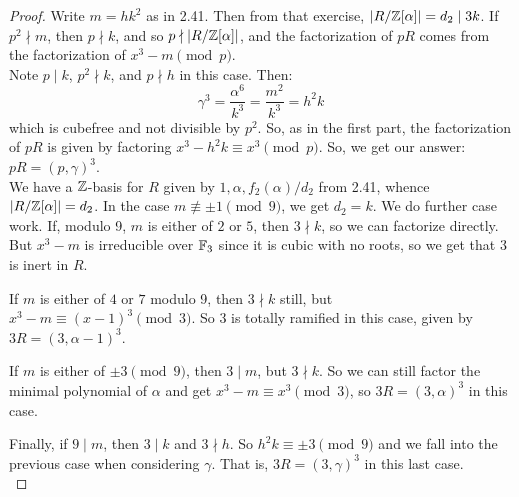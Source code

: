 \begin{proof}
	Write $m = hk^2$ as in 2.41. Then from that exercise, $|R/\mathbb{Z}[\alpha]| = d_2 \mid 3k$. If $p^2 \nmid m$, then $p \nmid k$, and so $p \nmid |R/\mathbb{Z}[\alpha]|$, and the factorization of $pR$ comes from the factorization of $x^3-m \pmod{p}$. \\
	
	Note $p \mid k$, $p^2 \nmid k$, and $p \nmid h$ in this case. Then:
	\[ \gamma^3 = \frac{\alpha^6}{k^3} = \frac{m^2}{k^3} = h^2k \]
	which is cubefree and not divisible by $p^2$. So, as in the first part, the factorization of $pR$ is given by factoring $x^3-h^2k \equiv x^3 \pmod{p}$. So, we get our answer: $pR = (p,\gamma)^3$. \\
	
	We have a $\mathbb{Z}$-basis for $R$ given by $1,\alpha,f_2(\alpha)/d_2$ from 2.41, whence $|R/\mathbb{Z}[\alpha]| = d_2$. In the case $m \not\equiv \pm 1 \pmod{9}$, we get $d_2 = k$. We do further case work. If, modulo 9, $m$ is either of $2$ or $5$, then $3 \nmid k$, so we can factorize directly. But $x^3-m$ is irreducible over $\mathbb{F}_3$ since it is cubic with no roots, so we get that $3$ is inert in $R$.
	
	If $m$ is either of $4$ or $7$ modulo 9, then $3 \nmid k$ still, but $x^3-m \equiv (x-1)^3 \pmod{3}$. So $3$ is totally ramified in this case, given by $3R = (3,\alpha-1)^3$.
	
	If $m$ is either of $\pm 3 \pmod{9}$, then $3 \mid m$, but $3 \nmid k$. So we can still factor the minimal polynomial of $\alpha$ and get $x^3-m \equiv x^3 \pmod{3}$, so $3R = (3,\alpha)^3$ in this case.
	
	Finally, if $9 \mid m$, then $3 \mid k$ and $3 \nmid h$. So $h^2k \equiv \pm 3 \pmod{9}$ and we fall into the previous case when considering $\gamma$. That is, $3R = (3,\gamma)^3$ in this last case. \\
	

\end{proof}
